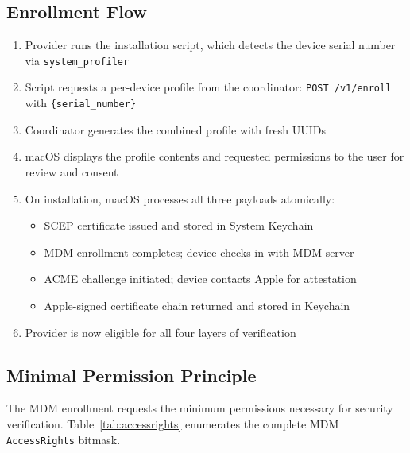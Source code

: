 \documentclass[10pt,twocolumn,letterpaper]{article}
\begin{document}
\subsection{Enrollment Flow}

\begin{enumerate}[leftmargin=*,itemsep=1pt]
    \item Provider runs the installation script, which detects the device serial number via \texttt{system\_profiler}
    \item Script requests a per-device profile from the coordinator: \texttt{POST /v1/enroll} with \texttt{\{serial\_number\}}
    \item Coordinator generates the combined profile with fresh UUIDs
    \item macOS displays the profile contents and requested permissions to the user for review and consent
    \item On installation, macOS processes all three payloads atomically:
    \begin{itemize}[leftmargin=*,itemsep=0pt]
        \item SCEP certificate issued and stored in System Keychain
        \item MDM enrollment completes; device checks in with MDM server
        \item ACME challenge initiated; device contacts Apple for attestation
        \item Apple-signed certificate chain returned and stored in Keychain
    \end{itemize}
    \item Provider is now eligible for all four layers of verification
\end{enumerate}

\subsection{Minimal Permission Principle}

The MDM enrollment requests the minimum permissions necessary for security verification. Table~\ref{tab:accessrights} enumerates the complete MDM \texttt{AccessRights} bitmask.
\end{document}
